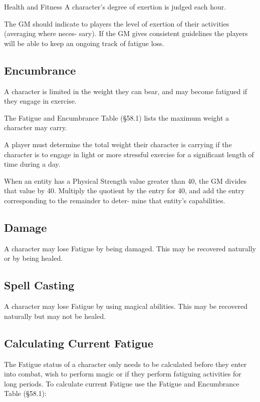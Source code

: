 \begin{Chapter}{Health and Fitness}
A character’s degree of exertion is judged each hour.

The GM should indicate to players the level of exertion of their
activities (averaging where neces- sary).  If the GM gives consistent
guidelines the players will be able to keep an ongoing track of
fatigue loss.

\subsection{Encumbrance}

A character is limited in the weight they can bear, and may become
fatigued if they engage in exercise.

The Fatigue and Encumbrance Table (§58.1) lists the maximum weight a
character may carry.

A player must determine the total weight their character is carrying
if the character is to engage in light or more stressful exercise for
a significant length of time during a day.

When an entity has a Physical Strength value greater than 40, the GM
divides that value by 40.  Multiply the quotient by the entry for 40,
and add the entry corresponding to the remainder to deter- mine that
entity’s capabilities.

\subsection{Damage}

A character may lose Fatigue by being damaged.  This may be recovered
naturally or by being healed.

\subsection{Spell Casting}

A character may lose Fatigue by using magical abilities. This may be
recovered naturally but may not be healed.

\subsection{Calculating Current Fatigue}

The Fatigue status of a character only needs to be calculated before
they enter into combat, wish to perform magic or if they perform
fatiguing activities for long periods.  To calculate current Fatigue
use the Fatigue and Encumbrance Table (§58.1):


\end{Chapter}

